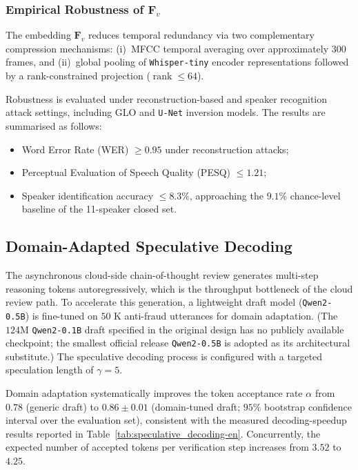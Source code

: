 \documentclass[a4paper,fleqn]{cas-sc}
\begin{document}
\subsubsection{Empirical Robustness of $\bm{F}_v$}

The embedding $\bm{F}_v$ reduces temporal redundancy via two complementary compression mechanisms: (i)~MFCC temporal averaging over approximately $300$ frames, and (ii)~global pooling of \texttt{Whisper-tiny} encoder representations followed by a rank-constrained projection ($\operatorname{rank} \le 64$).

Robustness is evaluated under reconstruction-based and speaker recognition attack settings, including GLO and \texttt{U-Net} inversion models. The results are summarised as follows:
\begin{itemize}
    \item Word Error Rate (WER) $\ge 0.95$ under reconstruction attacks;
    \item Perceptual Evaluation of Speech Quality (PESQ) $\le 1.21$;
    \item Speaker identification accuracy $\le 8.3\%$, approaching the $9.1\%$ chance-level baseline of the 11-speaker closed set.
\end{itemize}

\subsection{Domain-Adapted Speculative Decoding}\label{sec:specdec-method}

The asynchronous cloud-side chain-of-thought review generates multi-step reasoning tokens autoregressively, which is the throughput bottleneck of the cloud review path. To accelerate this generation, a lightweight draft model (\texttt{Qwen2-0.5B}) is fine-tuned on $50\text{~K}$ anti-fraud utterances for domain adaptation. (The $124\text{M}$ \texttt{Qwen2-0.1B} draft specified in the original design has no publicly available checkpoint; the smallest official release \texttt{Qwen2-0.5B} is adopted as its architectural substitute.) The speculative decoding process is configured with a targeted speculation length of $\gamma = 5$.

Domain adaptation systematically improves the token acceptance rate $\alpha$ from $0.78$ (generic draft) to $0.86 \pm 0.01$ (domain-tuned draft; $95\%$ bootstrap confidence interval over the evaluation set), consistent with the measured decoding-speedup results reported in Table~\ref{tab:speculative_decoding-en}. Concurrently, the expected number of accepted tokens per verification step increases from $3.52$ to $4.25$.
\end{document}
